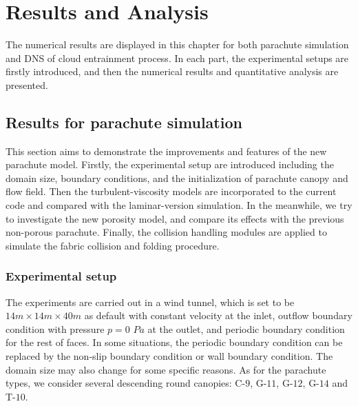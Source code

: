 \chapter{Results and Analysis}
The numerical results are displayed in this chapter for both parachute simulation and DNS of cloud entrainment process. In each part, the experimental setups are firstly introduced, and then the numerical results and quantitative analysis are presented.

\section{Results for parachute simulation}
This section aims to demonstrate the improvements and features of the new parachute model. Firstly, the experimental setup are introduced including the domain size, boundary conditions, and the initialization of parachute canopy and flow field. Then the turbulent-viscosity models are incorporated to the current code and compared with the laminar-version simulation. In the meanwhile, we try to investigate the new porosity model, and compare its effects with the previous non-porous parachute. Finally, the collision handling modules are applied to simulate the fabric collision and folding procedure.
 
\subsection{Experimental setup}
The experiments are carried out in a wind tunnel, which is set to be $14m\times14m\times 40m$ as default with constant velocity at the inlet, outflow boundary condition with pressure $p = 0$ $Pa$ at the outlet, and periodic boundary condition for the rest of faces. In some situations, the periodic boundary condition can be replaced by the non-slip boundary condition or wall boundary condition. The domain size may also change for some specific reasons. As for the parachute types, we consider several descending round canopies: C-$9$, G-$11$, G-$12$, G-$14$ and T-$10$. 

